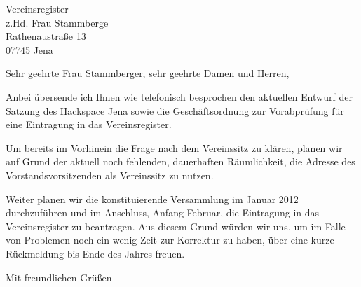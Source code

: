 \documentclass[fontsize=12pt,paper=a4,DIN]{scrlttr2}
\date{7. Dezember 2011}
\begin{document}
\begin{letter}{Vereinsregister \\ 
	z.Hd. Frau Stammberge \\ 
	Rathenaustraße 13 \\ 
	07745 Jena}


\opening{Sehr geehrte Frau Stammberger, sehr geehrte Damen und Herren,}

Anbei übersende ich Ihnen wie telefonisch besprochen den aktuellen 
Entwurf der Satzung des Hackspace Jena sowie die Geschäftsordnung 
zur Vorabprüfung für eine Eintragung in das Vereinsregi\-ster.

Um bereits im Vorhinein die Frage nach dem Vereinssitz zu klären, 
planen wir auf Grund der aktuell noch fehlenden, dauerhaften 
Räumlichkeit, die Adresse des Vorstandsvorsitzenden als Vereinssitz 
zu nutzen. 

Weiter planen wir die konstituierende Versammlung im Januar 2012 
durchzuführen und im Anschluss, Anfang Februar, die Eintragung in 
das Vereinsregister zu beantragen. Aus diesem Grund würden wir uns, 
um im Falle von Problemen noch ein wenig Zeit zur Korrektur zu haben,
über eine kurze Rückmeldung bis Ende des Jahres freuen. 


\closing{Mit freundlichen Grüßen}

\end{letter}
\end{document}
